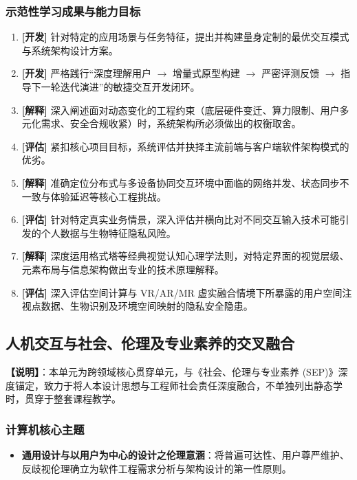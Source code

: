\subsubsection{示范性学习成果与能力目标}
\begin{enumerate}
    \item \textbf{[开发]} 针对特定的应用场景与任务特征，提出并构建量身定制的最优交互模式与系统架构设计方案。
    \item \textbf{[开发]} 严格践行“深度理解用户 $\to$ 增量式原型构建 $\to$ 严密评测反馈 $\to$ 指导下一轮迭代演进”的敏捷交互开发闭环。
    \item \textbf{[解释]} 深入阐述面对动态变化的工程约束（底层硬件变迁、算力限制、用户多元化需求、安全合规收紧）时，系统架构所必须做出的权衡取舍。
    \item \textbf{[评估]} 紧扣核心项目目标，系统评估并抉择主流前端与客户端软件架构模式的优劣。
    \item \textbf{[解释]} 准确定位分布式与多设备协同交互环境中面临的网络并发、状态同步不一致与体验延迟等核心工程挑战。
    \item \textbf{[评估]} 针对特定真实业务情景，深入评估并横向比对不同交互输入技术可能引发的个人数据与生物特征隐私风险。
    \item \textbf{[解释]} 深度运用格式塔等经典视觉认知心理学法则，对特定界面的视觉层级、元素布局与信息架构做出专业的技术原理解释。
    \item \textbf{[评估]} 深入评估空间计算与 VR/AR/MR 虚实融合情境下所暴露的用户空间注视点数据、生物识别及环境空间映射的隐私安全隐患。
\end{enumerate}

\subsection{人机交互与社会、伦理及专业素养的交叉融合}
\textbf{【说明】}：本单元为跨领域核心贯穿单元，与《社会、伦理与专业素养 (SEP)》深度锚定，致力于将人本设计思想与工程师社会责任深度融合，不单独列出静态学时，贯穿于整套课程教学。

\subsubsection{计算机核心主题}
\begin{itemize}
    \item \textbf{通用设计与以用户为中心的设计之伦理意涵}：将普遍可达性、用户尊严维护、反歧视伦理确立为软件工程需求分析与架构设计的第一性原则。
\end{itemize}

